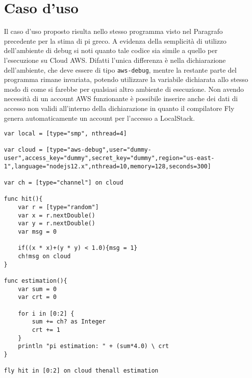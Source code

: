 \section{Caso d'uso}
Il caso d'uso proposto risulta nello stesso programma visto nel Paragrafo precedente per la stima di pi greco. A evidenza della semplicità di utilizzo dell'ambiente di debug si noti quanto tale codice sia simile a quello per l'esecuzione su Cloud AWS. Difatti l'unica differenza è nella dichiarazione dell'ambiente, che deve essere di tipo \verb|aws-debug|, mentre la restante parte del programma rimane invariata, potendo utilizzare la variabile dichiarata allo stesso modo di come si farebbe per qualsiasi altro ambiente di esecuzione. Non avendo necessità di un account AWS funzionante è possibile inserire anche dei dati di accesso non validi all'interno della dichiarazione in quanto il compilatore Fly genera automaticamente un account per l'accesso a LocalStack.\\

\begin{lstlisting}[language=FLY,caption={Stima di PI Greco usando il metodo Monte Carlo su ambiente aws-debug}, label={lst:debug}]
var local = [type="smp", nthread=4]

var cloud = [type="aws-debug",user="dummy-user",access_key="dummy",secret_key="dummy",region="us-east-1",language="nodejs12.x",nthread=10,memory=128,seconds=300]

var ch = [type="channel"] on cloud

func hit(){	
    var r = [type="random"]
    var x = r.nextDouble()
    var y = r.nextDouble()
    var msg = 0
    
    if((x * x)+(y * y) < 1.0){msg = 1}
    ch!msg on cloud
}

func estimation(){
    var sum = 0
    var crt = 0
    
    for i in [0:2] {
        sum += ch? as Integer
        crt += 1
    }
    println "pi estimation: " + (sum*4.0) \ crt
}

fly hit in [0:2] on cloud thenall estimation  

\end{lstlisting}